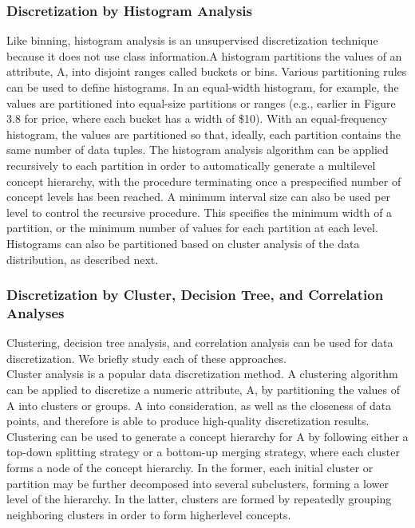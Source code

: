 \subsubsection{Discretization by Histogram Analysis}
Like binning, histogram analysis is an unsupervised discretization technique because it does not use class
information.A histogram partitions the values of an attribute, A, into disjoint ranges called buckets or bins.
Various partitioning rules can be used to define histograms. In an equal-width histogram, for
example, the values are partitioned into equal-size partitions or ranges (e.g., earlier in Figure 3.8 for price,
where each bucket has a width of \$10). With an equal-frequency histogram, the values are partitioned so that,
ideally, each partition contains the same number of data tuples. The histogram analysis algorithm can be
applied recursively to each partition in order to automatically generate a multilevel concept hierarchy, with the
procedure terminating once a prespecified number of concept levels has been reached. A minimum interval size
can also be used per level to control the recursive procedure. This specifies the minimum width of a partition,
or the minimum number of values for each partition at each level. Histograms can also be partitioned based on
cluster analysis of the data distribution, as described next.


\subsubsection{Discretization by Cluster, Decision Tree, and Correlation Analyses}

Clustering, decision tree analysis, and correlation analysis can be used for data discretization. We briefly study
each of these approaches.\\
Cluster analysis is a popular data discretization method. A clustering algorithm can be applied to discretize a
numeric attribute, A, by partitioning the values of A into clusters or groups. 
A into consideration, as well as the closeness of data points, and therefore is able to produce high-quality
discretization results.\\
Clustering can be used to generate a concept hierarchy for A by following either a top-down splitting strategy
or a bottom-up merging strategy, where each cluster forms a node of the concept hierarchy. In the former, each
initial cluster or partition may be further decomposed into several subclusters, forming a lower level of the
hierarchy. In the latter, clusters are formed by repeatedly grouping neighboring clusters in order to form higherlevel concepts. \\

